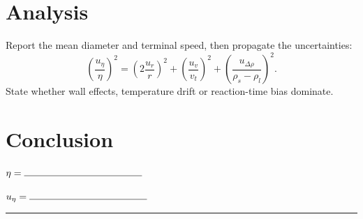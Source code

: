 \documentclass[11pt]{article}
\begin{document}
\section{Analysis}
Report the mean diameter and terminal speed, then propagate the uncertainties:
\begin{equation}
  \left(\frac{u_\eta}{\eta}\right)^2 =
  \left(2\frac{u_r}{r}\right)^2 +
  \left(\frac{u_v}{v_t}\right)^2 +
  \left(\frac{u_{\Delta\rho}}{\rho_s-\rho_l}\right)^2.
\end{equation}
State whether wall effects, temperature drift or reaction-time bias dominate.

\section{Conclusion}
\begin{description}[leftmargin=3.2cm,style=nextline]
\item[Viscosity] $\eta = \rule{0.35\linewidth}{0.4pt}$
\item[Uncertainty] $u_\eta = \rule{0.35\linewidth}{0.4pt}$
\item[Next check] \rule{0.65\linewidth}{0.4pt}
\end{description}



\end{document}
